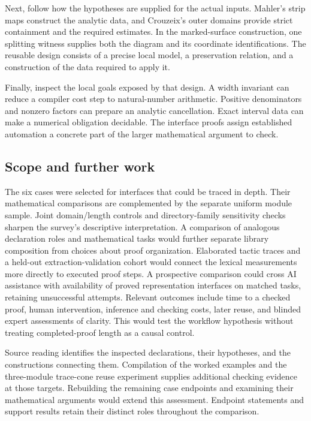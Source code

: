 Next, follow how the hypotheses are supplied for the actual inputs.
Mahler's strip maps construct the analytic data, and Crouzeix's outer
domains provide strict containment and the required estimates. In the
marked-surface construction, one splitting witness supplies both the
diagram and its coordinate identifications. The reusable design consists
of a precise local model, a preservation relation, and a construction of
the data required to apply it.

Finally, inspect the local goals exposed by that design. A width
invariant can reduce a compiler cost step to natural-number arithmetic.
Positive denominators and nonzero factors can prepare an analytic
cancellation. Exact interval data can make a numerical obligation
decidable. The interface proofs assign established automation a concrete
part of the larger mathematical argument to check.

\subsection{Scope and further work}

The six cases were selected for interfaces that could be traced in depth.
Their mathematical comparisons are complemented by the separate uniform
module sample. Joint domain/length controls and directory-family
sensitivity checks sharpen the survey's descriptive interpretation.
A comparison of analogous declaration roles and mathematical tasks would
further separate library composition from choices about proof organization.
Elaborated tactic traces and a held-out extraction-validation cohort
would connect the lexical measurements more directly to executed proof steps.
A prospective comparison could cross AI assistance with availability of
proved representation interfaces on matched tasks, retaining unsuccessful
attempts. Relevant outcomes include time to a checked proof, human
intervention, inference and checking costs, later reuse, and blinded
expert assessments of clarity. This would test the workflow hypothesis
without treating completed-proof length as a causal control.

Source reading identifies the inspected declarations, their hypotheses,
and the constructions connecting them. Compilation of the worked
examples and the three-module trace-cone reuse experiment supplies
additional checking evidence at those targets. Rebuilding the remaining
case endpoints and examining their mathematical arguments would extend
this assessment. Endpoint statements and support results retain their
distinct roles throughout the comparison.

